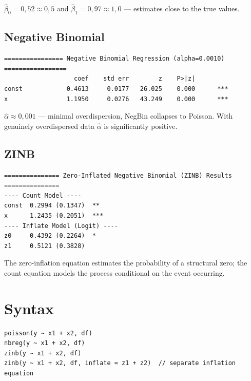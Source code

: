 $\hat\beta_0 = 0{,}52 \approx 0{,}5$ and $\hat\beta_1 = 0{,}97 \approx 1{,}0$ —
estimates close to the true values.

\subsection*{Negative Binomial}

\begin{lstlisting}[language={}, basicstyle=\ttfamily\small,
  frame=none, numbers=none, backgroundcolor=\color{codbg},
  xleftmargin=0pt, xrightmargin=0pt, breaklines=false]
================ Negative Binomial Regression (alpha=0.0010) =================
                   coef    std err        z    P>|z|
const            0.4613     0.0177   26.025    0.000      ***
x                1.1950     0.0276   43.249    0.000      ***
\end{lstlisting}

$\hat\alpha \approx 0{,}001$ — minimal overdispersion, NegBin collapses to Poisson. With genuinely overdispersed data $\hat\alpha$ is significantly positive.

\subsection*{ZINB}

\begin{lstlisting}[language={}, basicstyle=\ttfamily\small,
  frame=none, numbers=none, backgroundcolor=\color{codbg},
  xleftmargin=0pt, xrightmargin=0pt, breaklines=false]
=============== Zero-Inflated Negative Binomial (ZINB) Results ===============
---- Count Model ----
const  0.2994 (0.1347)  **
x      1.2435 (0.2051)  ***
---- Inflate Model (Logit) ----
z0     0.4392 (0.2264)  *
z1     0.5121 (0.3828)
\end{lstlisting}

The zero-inflation equation estimates the probability of a structural zero;
the count equation models the process conditional on the event occurring.

\section{Syntax}

\begin{lstlisting}
poisson(y ~ x1 + x2, df)
nbreg(y ~ x1 + x2, df)
zinb(y ~ x1 + x2, df)
zinb(y ~ x1 + x2, df, inflate = z1 + z2)  // separate inflation equation
\end{lstlisting}


